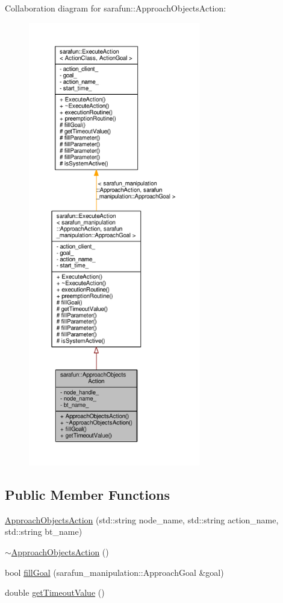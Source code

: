 Collaboration diagram for sarafun\-:\-:Approach\-Objects\-Action\-:
\nopagebreak
\begin{figure}[H]
\begin{center}
\leavevmode
\includegraphics[height=550pt]{d7/d78/classsarafun_1_1ApproachObjectsAction__coll__graph}
\end{center}
\end{figure}
\subsection*{Public Member Functions}
\begin{DoxyCompactItemize}
\item 
\hyperlink{classsarafun_1_1ApproachObjectsAction_ab0d857c262d75eeb85d8dc0e8f746f5f_ab0d857c262d75eeb85d8dc0e8f746f5f}{Approach\-Objects\-Action} (std\-::string node\-\_\-name, std\-::string action\-\_\-name, std\-::string bt\-\_\-name)
\item 
\hyperlink{classsarafun_1_1ApproachObjectsAction_adb6adaf7dae2e4addf53f47f07afd21e_adb6adaf7dae2e4addf53f47f07afd21e}{$\sim$\-Approach\-Objects\-Action} ()
\item 
bool \hyperlink{classsarafun_1_1ApproachObjectsAction_af5d216551122da780bc550daf4f1dca4_af5d216551122da780bc550daf4f1dca4}{fill\-Goal} (sarafun\-\_\-manipulation\-::\-Approach\-Goal \&goal)
\item 
double \hyperlink{classsarafun_1_1ApproachObjectsAction_a6852994a6e8a1edf9b2c24c91fd07df2_a6852994a6e8a1edf9b2c24c91fd07df2}{get\-Timeout\-Value} ()
\end{DoxyCompactItemize}
